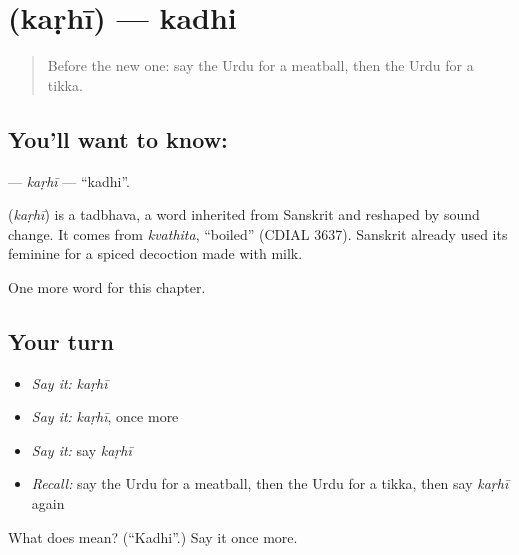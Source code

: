 \section[\texorpdfstring{\ur{کڑھی} (kaṛhī)}{کڑھی (kaṛhī)}]{ (kaṛhī) — kadhi}

\label{lesson:UR-C260-karhi}



\begin{quote}
Before the new one: say the Urdu for a meatball, then the Urdu for a tikka.
\end{quote}

\subsection*{You'll want to know: }
\textbf{} — \emph{kaṛhī} — \textquotedblleft{}kadhi\textquotedblright{}.

\begin{cousinweb}
\textbf{} (\emph{kaṛhī}) is a tadbhava, a word inherited from Sanskrit and reshaped by sound change. It comes from \emph{kvathita}, \textquotedblleft{}boiled\textquotedblright{} (CDIAL 3637). Sanskrit already used its feminine for a spiced decoction made with milk.
\end{cousinweb}

\begin{grammarlens}[title={What you've built}]
One more word for this chapter.
\end{grammarlens}

\subsection*{Your turn}
\begin{itemize}
\raggedright
  \item \emph{Say it:} \emph{kaṛhī}
  \item \emph{Say it:} \emph{kaṛhī}, once more
  \item \emph{Say it:} say \emph{kaṛhī}
  \item \emph{Recall:} say the Urdu for a meatball, then the Urdu for a tikka, then say \emph{kaṛhī} again
\end{itemize}

\begin{tcolorbox}[breakable,colback=teal!4,colframe=teal!35!black,title={Before you move on}]
What does  mean? (\textquotedblleft{}Kadhi\textquotedblright{}.) Say it once more.
\end{tcolorbox}
